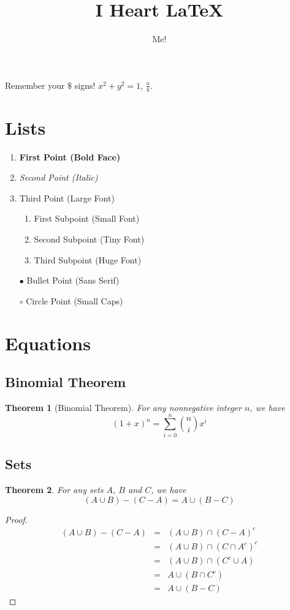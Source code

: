 \documentclass{article}  %
\title{I Heart \LaTeX}
\author{Me!}
\newtheorem*{thm}{Theorem}
\begin{document}
\maketitle




Remember your $\$$ signs!  $x^2+y^2=1$, $\frac{a}{b}$.

\section{Lists}
\begin{enumerate}
\item {\bf First Point (Bold Face)}
\item {\em Second Point (Italic)}
\item {\Large Third Point (Large Font)}
    \begin{enumerate}
        \item {\small First Subpoint (Small Font)} 
        \item {\tiny Second Subpoint (Tiny Font)} 
        \item {\Huge Third Subpoint (Huge Font)} 
    \end{enumerate}
\item[$\bullet$] {\sf Bullet Point (Sans Serif)}
\item[$\circ$] {\sc Circle Point (Small Caps)} 
\end{enumerate}


\section{Equations}

\subsection{Binomial Theorem}
\begin{thm}[Binomial Theorem]
For any nonnegative integer $n$, we have
$$(1+x)^n = \sum_{i=0}^n {n \choose i} x^i$$
\end{thm}


\subsection{Sets}

\begin{thm}
For any sets $A$, $B$ and $C$, we have
$$ (A\cup B)-(C-A) = A \cup (B-C)$$
\end{thm}

\begin{proof}
\begin{eqnarray*}
(A\cup B)-(C-A) &=& (A\cup B) \cap (C-A)^c\\
&=& (A\cup B) \cap (C \cap A^c)^c \\
&=& (A\cup B) \cap (C^c \cup A) \\
&=& A \cup (B\cap C^c) \\
&=& A \cup (B-C)
\end{eqnarray*}
\end{proof}
\end{document}

